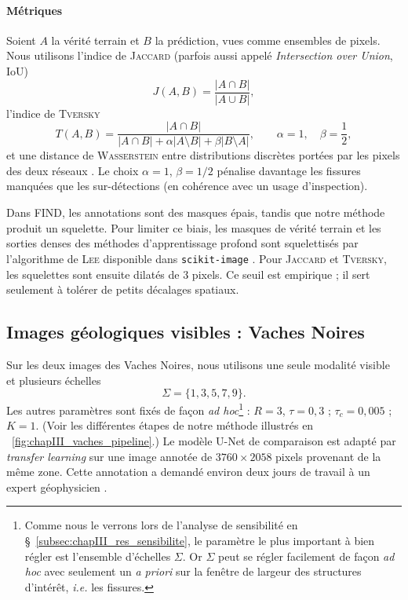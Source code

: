 \paragraph{Métriques}
Soient $A$ la vérité terrain et $B$ la prédiction, vues comme ensembles de pixels. Nous utilisons l'indice de \textsc{Jaccard} \cite{Jaccard1901} (parfois aussi appelé \emph{Intersection over Union}, IoU)
\begin{equation}
    J(A,B)=\frac{|A\cap B|}{|A\cup B|},
\end{equation}
l'indice de \textsc{Tversky} \cite{Tversky1977}
\begin{equation}
    T(A,B)
    =
    \frac{|A\cap B|}{|A\cap B|+\alpha|A\setminus B|+\beta|B\setminus A|},
    \qquad
    \alpha=1,\quad \beta=\frac12,
\end{equation}
et une distance de \textsc{Wasserstein} entre distributions discrètes portées par les pixels des deux réseaux \cite{Wasserstein}. Le choix $\alpha=1$, $\beta=1/2$ pénalise davantage les fissures manquées que les sur-détections (en cohérence avec un usage d'inspection).

Dans FIND, les annotations sont des masques épais, tandis que notre méthode produit un squelette. Pour limiter ce biais, les masques de vérité terrain et les sorties denses des méthodes d'apprentissage profond sont squelettisés par l'algorithme de \textsc{Lee} disponible dans \texttt{scikit-image} \cite{SciKitSkeletonization}. Pour \textsc{Jaccard} et \textsc{Tversky}, les squelettes sont ensuite dilatés de $3$ pixels. Ce seuil est empirique ; il sert seulement à tolérer de petits décalages spatiaux.

\subsection{Images géologiques visibles : Vaches Noires}
\label{subsec:chapIII_res_vaches}

Sur les deux images des Vaches Noires, nous utilisons une seule modalité visible et plusieurs échelles
\[
    \Sigma=\{1,3,5,7,9\}.
\]
Les autres paramètres sont fixés de façon \emph{ad hoc}\footnote{Comme nous le verrons lors de l'analyse de sensibilité en \S~\ref{subsec:chapIII_res_sensibilite}, le paramètre le plus important à bien régler est l'ensemble d'échelles $\Sigma$. Or $\Sigma$ peut se régler facilement de façon \emph{ad hoc} avec seulement un \emph{a priori} sur la fenêtre de largeur des structures d'intérêt, \emph{i.e.} les fissures.} : $R=3$, $\tau=0,3$ ; $\tau_c=0,005$ ; $K=1$. 
(Voir les différentes étapes de notre méthode illustrés en \Fig~\ref{fig:chapIII_vaches_pipeline}.)
Le modèle U-Net de comparaison est adapté par \emph{transfer learning} sur une image annotée de $3760\times2058$ pixels provenant de la même zone. Cette annotation a demandé environ deux jours de travail à un expert géophysicien \cite{BibiStrasbourg}.

